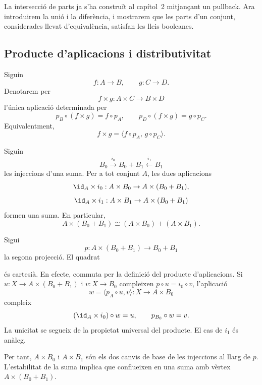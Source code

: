 La intersecció de parts ja s'ha construït al capítol~2 mitjançant un
pullback. Ara introduirem la unió i la diferència, i mostrarem que les
parts d'un conjunt, considerades llevat d'equivalència, satisfan les
lleis booleanes.

\subsection{Producte d'aplicacions i distributivitat}

\begin{notacio}\label{not:producte-aplicacions}
Siguin
\[
f:A\to B,
\qquad
g:C\to D.
\]
Denotarem per
\[
f\times g:A\times C\to B\times D
\]
l'única aplicació determinada per
\[
p_B\circ(f\times g)=f\circ p_A,
\qquad
p_D\circ(f\times g)=g\circ p_C.
\]
Equivalentment,
\[
f\times g
=
\langle f\circ p_A,\,g\circ p_C\rangle.
\]
\end{notacio}

\begin{teorema}\label{teo:distributivitat}
Siguin
\[
B_0\xrightarrow{i_0}B_0+B_1\xleftarrow{i_1}B_1
\]
les injeccions d'una suma. Per a tot conjunt \(A\), les
dues aplicacions
\[
\id_A\times i_0:A\times B_0\to A\times(B_0+B_1),
\]
\[
\id_A\times i_1:A\times B_1\to A\times(B_0+B_1)
\]
formen una suma. En particular,
\[
A\times(B_0+B_1)
\cong
(A\times B_0)+(A\times B_1).
\]
\end{teorema}

\begin{prova}
Sigui
\[
p:A\times(B_0+B_1)\to B_0+B_1
\]
la segona projecció. El quadrat
\begin{center}
\end{center}
és cartesià. En efecte, commuta per la definició del producte
d'aplicacions. Si \(u:X\to A\times(B_0+B_1)\) i \(v:X\to B_0\)
compleixen \(p\circ u=i_0\circ v\), l'aplicació
\[
w=\langle p_A\circ u,v\rangle:X\to A\times B_0
\]
compleix
\[
(\id_A\times i_0)\circ w=u,
\qquad
p_{B_0}\circ w=v.
\]
La unicitat se segueix de la propietat universal del producte. El cas
de \(i_1\) és anàleg.

Per tant, \(A\times B_0\) i \(A\times B_1\) són els dos canvis de base
de les injeccions al llarg de \(p\). L'estabilitat de la
suma implica que conflueixen en una suma amb vèrtex
\(A\times(B_0+B_1)\).
\end{prova}

